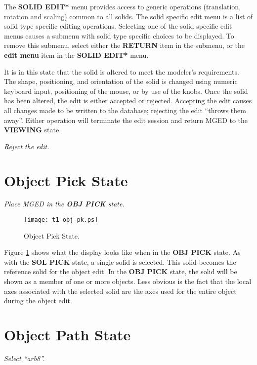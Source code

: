The {\bf *SOLID EDIT*} menu provides access to generic operations (translation, rotation
and scaling) common to all solids.
The solid specific edit menu is a list of solid type specific editing operations.
Selecting one of the solid specific edit menus causes a submenu with solid type specific
choices to be displayed.  To remove this submenu, select either the
{\bf RETURN} item in the submenu, or the {\bf edit menu} item in the
{\bf *SOLID EDIT*} menu.

It is in this state that the solid is altered to meet the modeler's
requirements. The shape, positioning, and orientation of the solid is
changed using numeric keyboard input, positioning of the mouse, or by
use of the knobs.  Once the solid has been altered, the edit is
either accepted or rejected.  Accepting the edit causes all changes
made to be written to the database; rejecting the edit ``throws them
away''. Either operation will terminate the edit session and return MGED
to the {\bf VIEWING} state.

\noindent
{\em Reject the edit.}\\

\section{Object Pick State}

\noindent
{\em Place MGED in the {\bf OBJ PICK} state.}\\

\begin{figure}
\centering \texttt{[image: t1-obj-pk.ps]}
\caption{Object Pick State.}
\label{t1-obj-pk}
\end{figure}

Figure \ref{t1-obj-pk} shows what the display looks like when in the
{\bf OBJ PICK} state. As with the {\bf SOL PICK} state, a single solid is
selected.  This solid becomes the reference solid for the object edit.
In the {\bf OBJ PICK} state, the solid will be shown
as a member of one or more objects.  Less obvious is the fact that the
local axes associated with the selected solid are the axes used for the
entire object during the object edit.

\section{Object Path State}

\noindent
{\em Select ``arb8''.}\\

